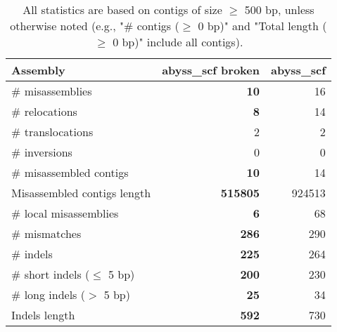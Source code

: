 \documentclass[12pt,a4paper]{article}
\begin{document}
\begin{table}[ht]
\begin{center}
\caption{All statistics are based on contigs of size $\geq$ 500 bp, unless otherwise noted (e.g., "\# contigs ($\geq$ 0 bp)" and "Total length ($\geq$ 0 bp)" include all contigs).}
\begin{tabular}{|l*{2}{|r}|}
\hline
Assembly & abyss\_scf broken & abyss\_scf \\ \hline
\# misassemblies & {\bf 10} & 16 \\ \hline
\hspace{5mm}\# relocations & {\bf 8} & 14 \\ \hline
\hspace{5mm}\# translocations & 2 & 2 \\ \hline
\hspace{5mm}\# inversions & 0 & 0 \\ \hline
\# misassembled contigs & {\bf 10} & 14 \\ \hline
Misassembled contigs length & {\bf 515805} & 924513 \\ \hline
\# local misassemblies & {\bf 6} & 68 \\ \hline
\# mismatches & {\bf 286} & 290 \\ \hline
\# indels & {\bf 225} & 264 \\ \hline
\hspace{5mm}\# short indels ($\leq$ 5 bp) & {\bf 200} & 230 \\ \hline
\hspace{5mm}\# long indels ($>$ 5 bp) & {\bf 25} & 34 \\ \hline
Indels length & {\bf 592} & 730 \\ \hline
\end{tabular}
\end{center}
\end{table}
\end{document}
